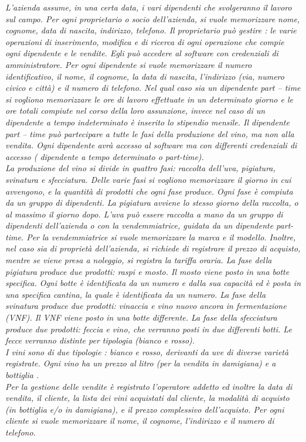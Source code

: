 \documentclass{article}
\begin{document}
\textit{L'azienda assume, in una certa data, i vari dipendenti che svolgeranno il lavoro sul campo. Per ogni proprietario o socio dell'azienda, si vuole memorizzare nome, cognome, data di nascita, indirizzo, telefono.
Il proprietario può gestire : le varie operazioni di inserimento, modifica e di ricerca di ogni operazione che compie ogni dipendente e le vendite. Egli può accedere al software con credenziali di amministratore.
Per ogni dipendente si vuole memorizzare il numero identificativo, il nome, il cognome, la data di nascita, l'indirizzo (via, numero civico e città) e il numero di telefono.
Nel qual caso sia un dipendente part – time si vogliono memorizzare le ore di lavoro effettuate in un determinato giorno e le ore totali compiute nel corso della loro assunzione, invece nel caso di un dipendente a tempo indeterminato è inserito lo stipendio mensile.
Il dipendente part – time può partecipare a tutte le fasi della produzione del vino, ma non alla vendita.
Ogni dipendente avrà accesso al software ma con differenti credenziali di accesso ( dipendente a tempo determinato o part-time).\\
La produzione del vino si divide in quattro fasi: raccolta dell'uva, pigiatura, svinatura e sfecciatura.
Delle varie fasi si vogliono memorizzare il giorno in cui avvengono, e la quantità di prodotti che ogni fase produce. Ogni fase è compiuta da un gruppo di dipendenti. La pigiatura avviene lo stesso giorno della raccolta, o al massimo il giorno dopo.
L’uva può essere raccolta a mano da un gruppo di dipendenti dell'azienda o con la vendemmiatrice, guidata da un dipendente part-time.
Per la vendemmiatrice si vuole memorizzare la marca e il modello. Inoltre, nel caso sia di proprietà dell'azienda, si richiede di registrare il prezzo di acquisto, mentre se viene presa a noleggio, si registra la tariffa oraria.
La fase della pigiatura produce due prodotti: raspi e mosto. Il mosto viene posto in una botte specifica.
Ogni botte è identificata da un numero e dalla sua capacità ed è posta in una specifica cantina, la quale è identificata da un numero.
La fase della svinatura produce due prodotti: vinaccia e vino nuovo ancora in fermentazione (VNF). Il VNF viene posto in una botte differente. 
La fase della sfecciatura produce due prodotti: feccia e vino, che verranno posti in due differenti botti. Le fecce verranno distinte per tipologia (bianco e rosso).\\
I vini sono di due tipologie : bianco e rosso, derivanti da uve di diverse varietà registrate. Ogni vino ha un prezzo al litro (per la vendita in damigiana) e a bottiglia .\\
Per la gestione delle vendite è registrato l'operatore addetto ed inoltre la data di vendita, il cliente, la lista dei vini acquistati dal cliente, la modalità di acquisto (in bottiglia e/o in damigiana), e il prezzo complessivo dell'acquisto. Per ogni cliente si vuole memorizzare il nome, il cognome, l'indirizzo e il numero di telefono.}
\end{document}
